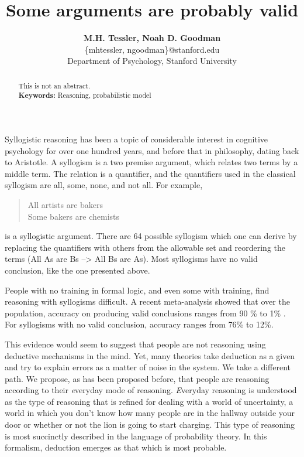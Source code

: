 \documentclass[10pt,letterpaper]{article}
\begin{document}
\title{Some arguments are probably valid}
 
\author{{\large \bf M.H. Tessler, Noah D. Goodman } \\
	\{mhtessler, ngoodman\}@stanford.edu \\
  Department of Psychology, Stanford University}

\maketitle


\begin{abstract}
This is not an abstract.\\
\textbf{Keywords:} 
Reasoning, probabilistic model
\end{abstract}

Syllogistic reasoning has been a topic of considerable interest in cognitive psychology for over one hundred years, and before that in philosophy, dating back to Aristotle. A syllogism is a two premise argument, which relates two terms by a middle term. The relation is a quantifier, and the quantifiers used in the classical syllogism are all, some, none, and not all. For example,

\begin{quotation}
All artists are bakers\\
Some bakers are chemists\\
\end{quotation}

is a syllogistic argument. There are 64 possible syllogism which one can derive by replacing the quantifiers with others from the allowable set and reordering the terms (All As are Bs --> All Bs are As). Most syllogisms have no valid conclusion, like the one presented above. 

People with no training in formal logic, and even some with training, find reasoning with syllogisms difficult. A recent meta-analysis showed that over the population, accuracy on producing valid conclusions ranges from 90 \% to 1\% \cite{khemlaniJL2012}. For syllogisms with no valid conclusion, accuracy ranges from 76\% to 12\%.

This evidence would seem to suggest that people are not reasoning using deductive mechanisms in the mind. Yet, many theories take deduction as a given and try to explain errors as a matter of noise in the system. We take a different path. We propose, as has been proposed before, that people are reasoning according to their {\emph everyday} mode of reasoning. {\emph Everyday} reasoning is understood as the type of reasoning that is refined for dealing with a world of uncertainty, a world in which you don't know how many people are in the hallway outside your door or whether or not the lion is going to start charging. This type of reasoning is most succinctly described in the language of probability theory. In this formalism, deduction emerges as that which is most probable.
\end{document}
